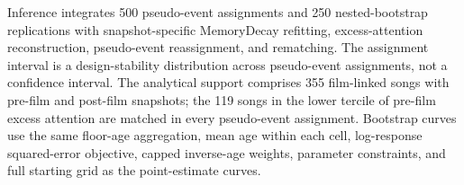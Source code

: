\begin{table}[!htbp]
\begin{tabular}{>{\raggedright\arraybackslash}p{0.52\linewidth}>{\centering\arraybackslash}p{0.18\linewidth}}
\bottomrule
\end{tabular}
\begin{flushleft}\footnotesize
Inference integrates 500 pseudo-event assignments and 250 nested-bootstrap replications with snapshot-specific MemoryDecay refitting, excess-attention reconstruction, pseudo-event reassignment, and rematching. The assignment interval is a design-stability distribution across pseudo-event assignments, not a confidence interval. The analytical support comprises 355 film-linked songs with pre-film and post-film snapshots; the 119 songs in the lower tercile of pre-film excess attention are matched in every pseudo-event assignment. Bootstrap curves use the same floor-age aggregation, mean age within each cell, log-response squared-error objective, capped inverse-age weights, parameter constraints, and full starting grid as the point-estimate curves.
\end{flushleft}
\end{table}

